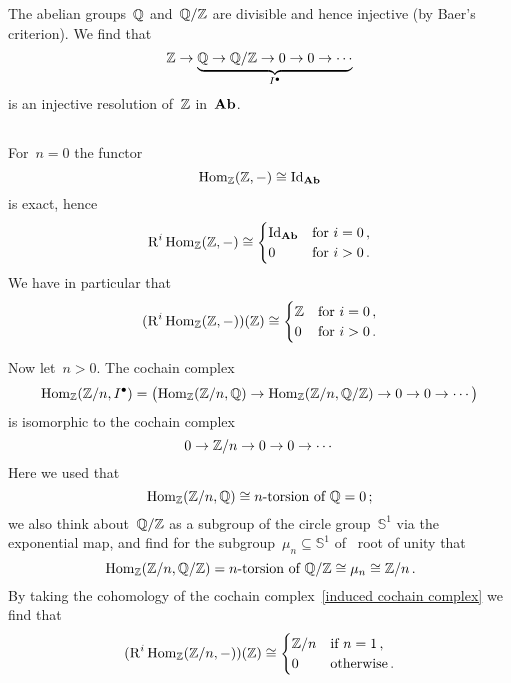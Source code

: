 \section{}





\subsection{}

The abelian groups~$\mathbb{Q}$ and~$\mathbb{Q}/\mathbb{Z}$ are divisible and hence injective (by Baer’s criterion).
We find that
\[
  \mathbb{Z}
  \to
  \underbrace{
  \mathbb{Q}
  \to
  \mathbb{Q}/\mathbb{Z}
  \to
  0
  \to
  0
  \to
  \dotsb
  }_{I^\bullet}
\]
is an injective resolution of~$\mathbb{Z}$ in~$\mathbf{Ab}$.





\subsection{}

For~$n = 0$ the functor
\[
  \operatorname{Hom}_{\mathbb{Z}}(\mathbb{Z}, -)
  \cong
  \mathrm{Id}_{\mathbf{Ab}}
\]
is exact, hence
\[
  \operatorname{R}^i \operatorname{Hom}_{\mathbb{Z}}(\mathbb{Z}, -)
  \cong
  \begin{cases}
    \mathrm{Id}_{\mathbf{Ab}} & \text{for~$i = 0$}  \,, \\
    0         & \text{for~$i > 0$}  \,.
  \end{cases}
\]
We have in particular that
\[
  ( \operatorname{R}^i \operatorname{Hom}_{\mathbb{Z}}(\mathbb{Z}, -) )(\mathbb{Z})
  \cong
  \begin{cases}
    \mathbb{Z}  & \text{for~$i = 0$}  \,, \\
    0         & \text{for~$i > 0$}  \,.
  \end{cases}
\]

Now let~$n > 0$.
The cochain complex
\[
  \operatorname{Hom}_{\mathbb{Z}}(\mathbb{Z}/n, I^\bullet)
  =
  \bigl(
  \operatorname{Hom}_{\mathbb{Z}}(\mathbb{Z}/n, \mathbb{Q})
  \to
  \operatorname{Hom}_{\mathbb{Z}}(\mathbb{Z}/n, \mathbb{Q}/\mathbb{Z})
  \to
  0
  \to
  0
  \to
  \dotsb
  \bigr)
\]
is isomorphic to the cochain complex
\begin{equation}
  \label{induced cochain complex}
  0
  \to
  \mathbb{Z}/n
  \to
  0
  \to
  0
  \to
  \dotsb
\end{equation}
Here we used that
\[
  \Hom_\Integer(\Integer/n, \Rational)
  \cong
  \text{\dash{$n$}{torsion} of~$\Rational$}
  =
  0 \,;
\]
we also think about~$\mathbb{Q}/\mathbb{Z}$ as a subgroup of the circle group~$\mathbb{S}^1$ via the exponential map, and find for the subgroup~$\mu_n \subseteq \mathbb{S}^1$ of~ root of unity that
\[
  \Hom_\Integer(\Integer/n, \Rational/\Integer)
  =
  \text{\dash{$n$}{torsion} of~$\Rational/\Integer$}
  \cong
  \mu_n
  \cong
  \Integer/n \,.
\]
By taking the cohomology of the cochain complex~\eqref{induced cochain complex} we find that
\[
  ( \operatorname{R}^i \operatorname{Hom}_{\mathbb{Z}}(\mathbb{Z}/n, -) )(\mathbb{Z})
  \cong
  \begin{cases}
    \mathbb{Z}/n  & \text{if~$n = 1$} \,, \\
    0           & \text{otherwise}  \,.
  \end{cases}
\]




